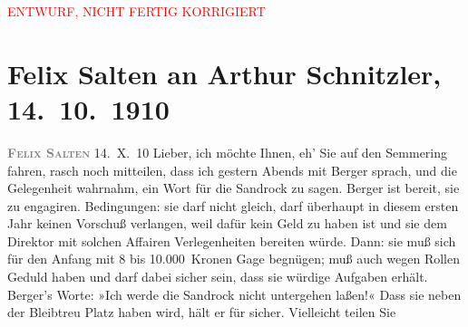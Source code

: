 
\begin{center}
            \textcolor{red}{ENTWURF, NICHT FERTIG KORRIGIERT}
                      \end{center}
            
         
         \renewcommand{\erwaehntePersonen}{Personen: Alfred von Berger, Hedwig Bleibtreu, Adele Sandrock, Olga Schnitzler}
         \renewcommand{\erwaehnteOrte}{Orte: Semmering, Wien}
         \renewcommand{\erwaehnteWerke}{}
               \section[Felix Salten an Arthur Schnitzler, 14. 10. 1910]{ Felix Salten an Arthur Schnitzler, 14. 10. 1910}\nopagebreak{}\rehead{ }\begin{ledgroupsized}[t]{13cm}\normalsize\beginnumbering \toendnotes[C]{\smallbreak\pagebreak[2]} 
\pstart
           \noindent{}{\pb}\textcolor{gray}{\textbf{\textsc{Felix Salten}}}\pend
           \pstart
           \raggedleft{}14. X. 10\pend
           \pstart{}Lieber,\pend\pstart
           ich möchte Ihnen, eh’ Sie auf den Semmering fahren,
               rasch noch mitteilen, dass ich gestern Abends mit Berger sprach, und die Gelegenheit wahrnahm, ein Wort für die Sandrock zu sagen. Berger
               ist bereit, sie zu engagiren. Bedingungen: sie darf nicht gleich, darf überhaupt in
               diesem ersten Jahr keinen Vorschuß verlangen, weil dafür kein Geld zu haben ist und
               sie dem Direktor mit solchen Affairen Verlegenheiten bereiten würde. Dann: sie muß
               sich für den Anfang mit 8 bis 10.000 Kronen Gage begnügen; muß auch wegen Rollen
               Geduld haben und darf dabei sicher sein, dass sie würdige Aufgaben erhält. Berger’s Worte: »Ich werde die Sandrock nicht untergehen laßen!« Dass sie neben der Bleibtreu Platz haben wird, hält er für sicher. Vielleicht teilen Sie

\end{ledgroupsized}
